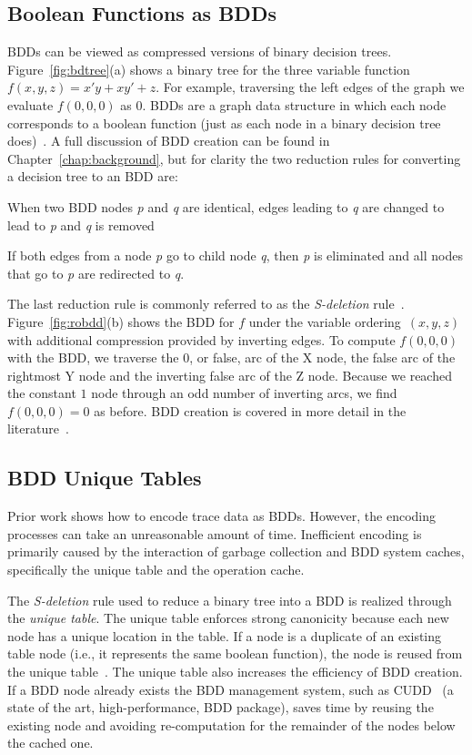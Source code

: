 {\subsection{Boolean Functions as BDDs}

BDDs can be viewed as compressed versions of binary decision trees. Figure~\ref{fig:bdtree}(a) shows a binary tree for the three variable function $f(x,y,z) = x'y + xy' + z$.  For example, traversing the left edges of the graph we evaluate $f(0,0,0)$ as $0$.  BDDs are a graph data structure in which each node corresponds to a boolean function (just as each node in a binary decision tree does)~\cite{bryant:86:ieeetc}. A full discussion of BDD creation can be found in Chapter~\ref{chap:background}, but for clarity the two reduction rules for converting a decision tree to an BDD are:

 When two BDD nodes \textit{p} and \textit{q} are identical, edges
 leading to \textit{q} are changed to lead to \textit{p} and \textit{q} is removed

 If both edges from a node \textit{p} go to
 child node \textit {q}, then \textit{p} is eliminated and all nodes that go to \textit{p} are redirected to \textit{q}.

The last reduction rule is commonly referred to as the \textit{S-deletion} rule~\cite{minato:01:STTT}. Figure~\ref{fig:robdd}(b) shows the BDD for $f$ under the variable ordering~$(x,y,z)$ with additional compression provided by inverting edges. To compute $f(0,0,0)$ with the BDD, we traverse the $0$, or false, arc of the X node, the false arc of the rightmost Y node and the inverting false arc of the Z node. Because we reached the constant $1$ node through an odd number of inverting arcs, we find $f(0,0,0)=0$ as before. BDD creation is covered in more detail in the literature~\cite{somenzi:09:cu,bryant:86:ieeetc,price:06:cal}.

\subsection{BDD Unique Tables}

Prior work shows how to encode trace data as BDDs.  However, the encoding processes can take an unreasonable amount of time. Inefficient encoding is primarily caused by the interaction of garbage collection and BDD system caches, specifically the unique table and the operation cache.

The \textit{S-deletion} rule used to reduce a binary tree into a BDD is realized through the \textit{unique table}.  The unique table enforces strong canonicity because each new node has a unique location in the table.  If a node is a duplicate of an existing table node (i.e., it represents the same boolean function), the node is reused from the unique table~\cite{bryant:86:ieeetc}. The unique table also increases the efficiency of BDD creation.  If a BDD node already exists the BDD management system, such as CUDD~\cite{somenzi:09:cu} (a state of the art, high-performance, BDD package), saves time by reusing the existing node and avoiding re-computation for the remainder of the nodes below the cached one.

}
